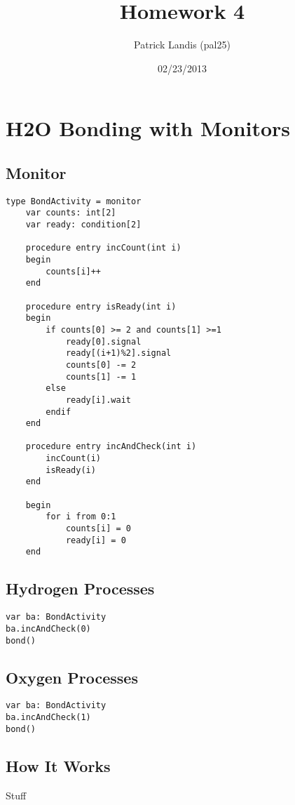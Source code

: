 \documentclass[]{article}
\title{Homework 4}
\author{Patrick Landis (pal25)}
\date{02/23/2013}
\begin{document}
\maketitle

\section{H2O Bonding with Monitors}
\subsection{Monitor}
\begin{verbatim}
type BondActivity = monitor
    var counts: int[2]
    var ready: condition[2]

    procedure entry incCount(int i)
    begin
        counts[i]++
    end
    
    procedure entry isReady(int i)
    begin
        if counts[0] >= 2 and counts[1] >=1
            ready[0].signal
   	        ready[(i+1)%2].signal
   	        counts[0] -= 2
   	        counts[1] -= 1
        else
            ready[i].wait
        endif
    end
	
    procedure entry incAndCheck(int i)
        incCount(i)
        isReady(i)
    end
	
    begin
        for i from 0:1
            counts[i] = 0
            ready[i] = 0
    end 
\end{verbatim}

\begin{multicols}{2}
\subsection{Hydrogen Processes}
\begin{verbatim}
var ba: BondActivity
ba.incAndCheck(0)
bond()
\end{verbatim}

\subsection{Oxygen Processes}
\begin{verbatim}
var ba: BondActivity
ba.incAndCheck(1)
bond()
\end{verbatim}
\end{multicols}

\subsection{How It Works}
Stuff
\newpage
\end{document}
